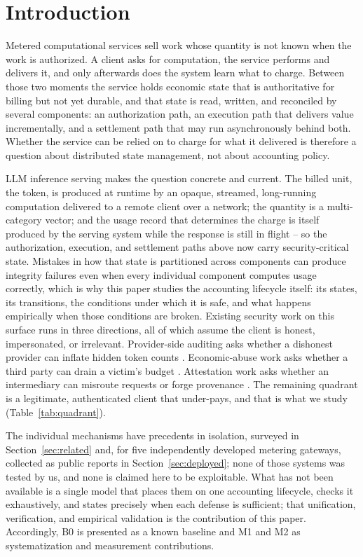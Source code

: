 \documentclass[final,5p,times,twocolumn,number]{elsarticle}
\begin{document}
\section{Introduction}
\label{sec:intro}
Metered computational services sell work whose quantity is not known when the work is
authorized. A client asks for computation, the service performs and delivers it, and only
afterwards does the system learn what to charge. Between those two moments the service
holds economic state that is authoritative for billing but not yet durable, and that
state is read, written, and reconciled by several components: an authorization path, an
execution path that delivers value incrementally, and a settlement path that may run
asynchronously behind both. Whether the service can be relied on to charge for what it
delivered is therefore a question about distributed state management, not about
accounting policy.

LLM inference serving makes the question concrete and current. The billed unit, the
token, is produced at runtime by an opaque, streamed, long-running computation delivered
to a remote client over a network; the quantity is a multi-category vector; and the
usage record that determines the charge is itself produced by the serving system while
the response is still in flight -- so the authorization, execution, and settlement paths
above now carry security-critical state. Mistakes in how that state is
partitioned across components can produce integrity failures even when every individual
component computes usage correctly, which is why this paper studies the accounting
lifecycle itself: its states, its transitions, the conditions under which it is safe, and
what happens empirically when those conditions are broken.
Existing security
work on this surface runs in three directions, all of which assume the client is honest,
impersonated, or irrelevant. Provider-side auditing asks whether a dishonest provider can
inflate hidden token counts \citep{coin,invisible,tokeninflation}. Economic-abuse work asks
whether a third party can drain a victim's budget \citep{dow,dowreview,owasp,llmjacking}.
Attestation work asks whether an intermediary can misroute requests or forge provenance
\citep{aex,gwprov}. The remaining quadrant is a legitimate, authenticated client that
under-pays, and that is what we study (Table~\ref{tab:quadrant}).

The individual mechanisms have precedents in isolation, surveyed in
Section~\ref{sec:related} and, for five independently developed metering gateways,
collected as public reports in Section~\ref{sec:deployed}; none of those systems was
tested by us, and none is claimed here to be exploitable. What has not been available is a
single model that places them on one accounting lifecycle, checks it exhaustively, and
states precisely when each defense is sufficient; that unification, verification, and
empirical validation is the contribution of this paper. Accordingly, B0 is presented as a
known baseline and M1 and M2 as systematization and measurement contributions.
\end{document}
